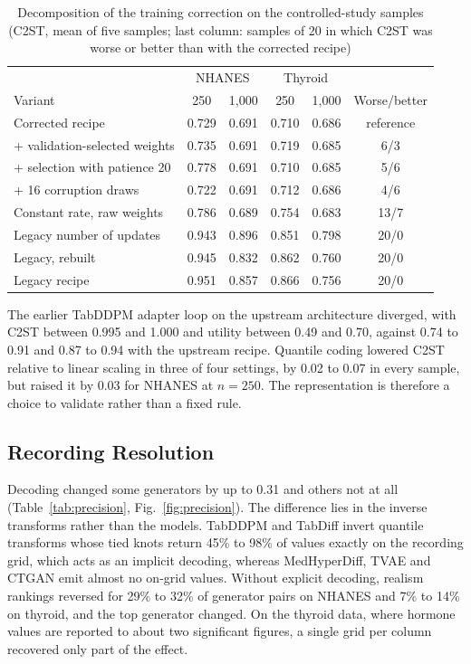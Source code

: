 \documentclass[conference]{IEEEtran}
\begin{document}
\begin{table}[t]
\caption{Decomposition of the training correction on the controlled-study samples (C2ST, mean of five samples; last column: samples of 20 in which C2ST was worse or better than with the corrected recipe)}
\label{tab:decomp}
\centering
\setlength{\tabcolsep}{2.4pt}
\begin{tabular}{lccccc}
\toprule
& \multicolumn{2}{c}{NHANES} & \multicolumn{2}{c}{Thyroid} & \\
Variant & 250 & 1,000 & 250 & 1,000 & Worse/better \\
\midrule
Corrected recipe & 0.729 & 0.691 & 0.710 & 0.686 & reference \\
+ validation-selected weights & 0.735 & 0.691 & 0.719 & 0.685 & 6/3 \\
+ selection with patience 20 & 0.778 & 0.691 & 0.710 & 0.685 & 5/6 \\
+ 16 corruption draws & 0.722 & 0.691 & 0.712 & 0.686 & 4/6 \\
Constant rate, raw weights & 0.786 & 0.689 & 0.754 & 0.683 & 13/7 \\
Legacy number of updates & 0.943 & 0.896 & 0.851 & 0.798 & 20/0 \\
Legacy, rebuilt & 0.945 & 0.832 & 0.862 & 0.760 & 20/0 \\
Legacy recipe & 0.951 & 0.857 & 0.866 & 0.756 & 20/0 \\
\bottomrule
\end{tabular}
\end{table}

The earlier TabDDPM adapter loop on the upstream architecture diverged, with C2ST between 0.995 and 1.000 and utility between 0.49 and 0.70, against 0.74 to 0.91 and 0.87 to 0.94 with the upstream recipe. Quantile coding lowered C2ST relative to linear scaling in three of four settings, by 0.02 to 0.07 in every sample, but raised it by 0.03 for NHANES at $n = 250$. The representation is therefore a choice to validate rather than a fixed rule.

\subsection{Recording Resolution}

Decoding changed some generators by up to 0.31 and others not at all (Table~\ref{tab:precision}, Fig.~\ref{fig:precision}). The difference lies in the inverse transforms rather than the models. TabDDPM and TabDiff invert quantile transforms whose tied knots return 45\% to 98\% of values exactly on the recording grid, which acts as an implicit decoding, whereas MedHyperDiff, TVAE and CTGAN emit almost no on-grid values. Without explicit decoding, realism rankings reversed for 29\% to 32\% of generator pairs on NHANES and 7\% to 14\% on thyroid, and the top generator changed. On the thyroid data, where hormone values are reported to about two significant figures, a single grid per column recovered only part of the effect.
\end{document}
